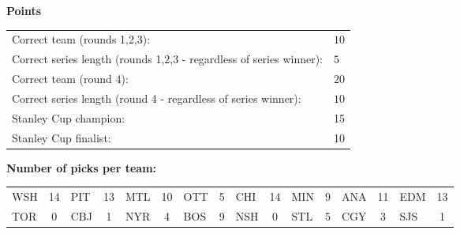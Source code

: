 \documentclass[10pt]{article}
\begin{document}
{\bf Points}\\
\begin{minipage}{12cm}
    \begin{tabular}{l l}
        Correct team (rounds 1,2,3):	& $10$\\
        Correct series length (rounds 1,2,3 - regardless of series winner):	& $5$\\
        Correct team (round 4):	& $20$\\
        Correct series length (round 4 - regardless of series winner):	& $10$\\
        Stanley Cup champion:	& 15\\
        Stanley Cup finalist:	& 10\\
    \end{tabular}

    \vspace{1cm}
    {\bf Number of picks per team:}\\
    \begin{tabular}{lc | lc | lc | lc | lc | lc | lc | lc }
        WSH & 14 & PIT & 13 & MTL & 10 & OTT & 5 & CHI & 14 & MIN & 9 & ANA & 11 & EDM & 13 \\
        TOR & 0 & CBJ & 1 & NYR & 4 & BOS & 9 & NSH & 0 & STL & 5 & CGY & 3 & SJS & 1 \\
    \end{tabular}
\end{minipage}
\end{document}
